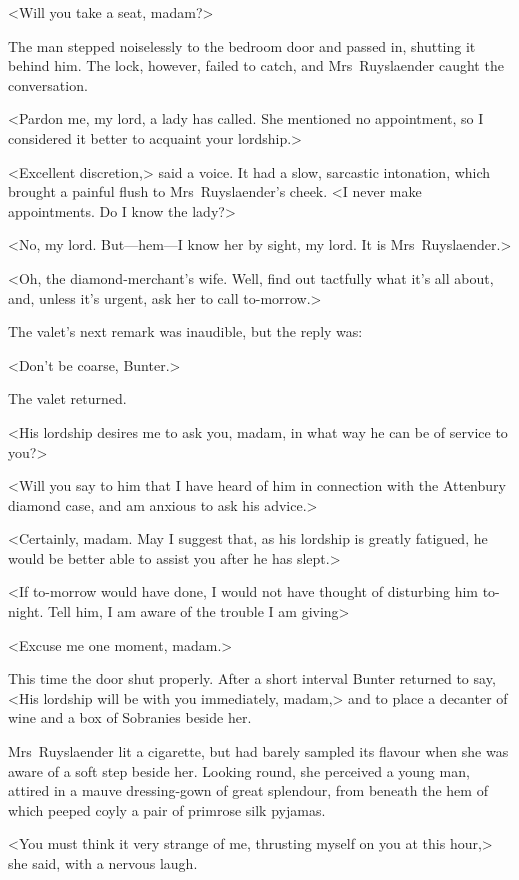 <Will you take a seat, madam?>

The man stepped noiselessly to the bedroom door and passed in, shutting it behind him. The lock, however, failed to catch, and Mrs~Ruyslaender caught the conversation.

<Pardon me, my lord, a lady has called. She mentioned no appointment, so I considered it better to acquaint your lordship.>

<Excellent discretion,> said a voice. It had a slow, sarcastic intonation, which brought a painful flush to Mrs~Ruyslaender's cheek. <I never make appointments. Do I know the lady?>

<No, my lord. But—hem—I know her by sight, my lord. It is Mrs~Ruyslaender.>

<Oh, the diamond-merchant's wife. Well, find out tactfully what it's all about, and, unless it's urgent, ask her to call to-morrow.>

The valet's next remark was inaudible, but the reply was:

<Don't be coarse, Bunter.>

The valet returned.

<His lordship desires me to ask you, madam, in what way he can be of service to you?>

<Will you say to him that I have heard of him in connection with the Attenbury diamond case, and am anxious to ask his advice.>

<Certainly, madam. May I suggest that, as his lordship is greatly fatigued, he would be better able to assist you after he has slept.>

<If to-morrow would have done, I would not have thought of disturbing him to-night. Tell him, I am aware of the trouble I am giving\longdash>

<Excuse me one moment, madam.>

This time the door shut properly. After a short interval Bunter returned to say, <His lordship will be with you immediately, madam,> and to place a decanter of wine and a box of Sobranies beside her.

Mrs~Ruyslaender lit a cigarette, but had barely sampled its flavour when she was aware of a soft step beside her. Looking round, she perceived a young man, attired in a mauve dressing-gown of great splendour, from beneath the hem of which peeped coyly a pair of primrose silk pyjamas.

<You must think it very strange of me, thrusting myself on you at this hour,> she said, with a nervous laugh.

